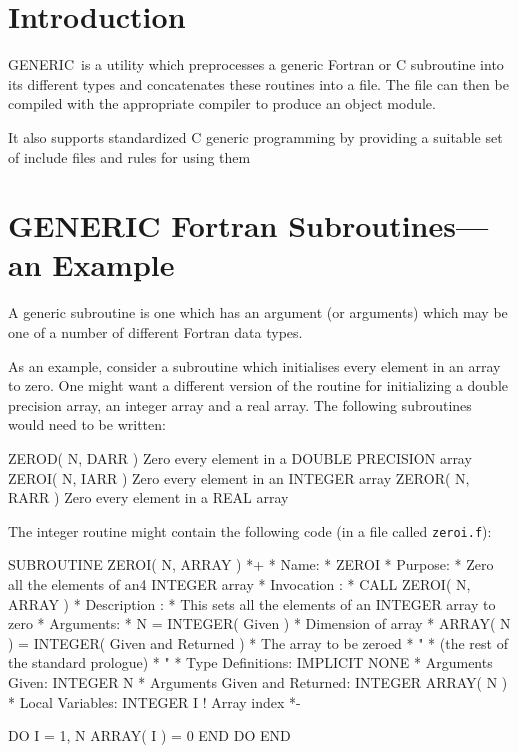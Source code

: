 \documentclass[twoside,11pt,nolof]{starlink}
\providecommand{\GENERIC}{{\footnotesize GENERIC}\normalsize}
\begin{document}
\scfrontmatter


\section{Introduction}

\GENERIC\ is a utility which preprocesses a generic Fortran or C subroutine
into its different types and concatenates these routines into a file.
The file can then be compiled with the appropriate compiler to produce an
object module.

It also supports standardized C generic programming by providing a suitable
set of include files and rules for using them

\section{GENERIC Fortran Subroutines---an Example}

A generic subroutine is one which has an argument (or arguments)
which may be one of a number of different Fortran data types.

As an example, consider a subroutine which initialises every
element in an array to zero.
One might want a different version of the routine for initializing
a double precision array, an integer array and a real array.
The following subroutines would need to be written:

\begin{terminalv}
      ZEROD( N, DARR )   Zero every element in a DOUBLE PRECISION array
      ZEROI( N, IARR )   Zero every element in an INTEGER array
      ZEROR( N, RARR )   Zero every element in a REAL array
\end{terminalv}

The integer routine might contain the following code (in a file
called \texttt{zeroi.f}):

\begin{terminalv}
          SUBROUTINE ZEROI( N, ARRAY )
    *+
    *  Name:
    *     ZEROI
    *  Purpose:
    *     Zero all the elements of an4 INTEGER array
    *  Invocation :
    *     CALL ZEROI( N, ARRAY )
    *  Description :
    *     This sets all the elements of an INTEGER array to zero
    *  Arguments:
    *     N = INTEGER( Given )
    *        Dimension of array
    *     ARRAY( N ) = INTEGER( Given and Returned )
    *        The array to be zeroed
    *                   "
    *     (the rest of the standard prologue)
    *                   "
    *  Type Definitions:
          IMPLICIT NONE
    *  Arguments Given:
          INTEGER N
    *  Arguments Given and Returned:
          INTEGER ARRAY( N )
    *  Local Variables:
          INTEGER I                   ! Array index
    *-

          DO I = 1, N
             ARRAY( I ) = 0
          END DO
          END
\end{terminalv}
\end{document}
